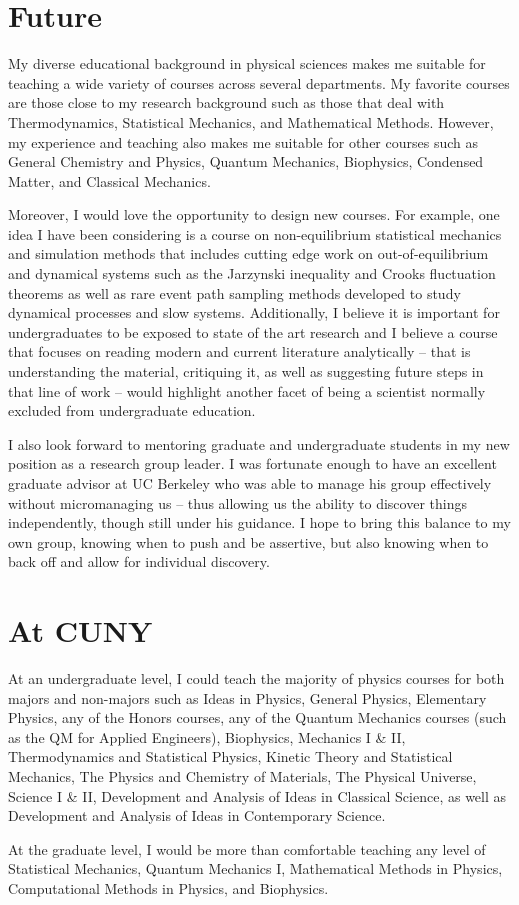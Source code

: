 \documentclass[11pt]{article}
\begin{document}
\section{Future} %

My diverse educational background in physical sciences makes me suitable for teaching a wide variety of courses across several departments.  My favorite courses are those close to my research background such as those that deal with Thermodynamics, Statistical Mechanics, and Mathematical Methods.  However, my experience and teaching also makes me suitable for other courses such as General Chemistry and Physics, Quantum Mechanics, Biophysics, Condensed Matter, and Classical Mechanics.

Moreover, I would love the opportunity to design new courses.  For example, one idea I have been considering is a course on non-equilibrium statistical mechanics and simulation methods that includes cutting edge work on out-of-equilibrium and dynamical systems such as the Jarzynski inequality and Crooks fluctuation theorems as well as rare event path sampling methods developed to study dynamical processes and slow systems.  Additionally, I believe it is important for undergraduates to be exposed to state of the art research and I believe a course that focuses on reading modern and current literature analytically -- that is understanding the material, critiquing it, as well as suggesting future steps in that line of work -- would highlight another facet of being a scientist normally excluded from undergraduate education.

I also look forward to mentoring graduate and undergraduate students in my new position as a research group leader.  I was fortunate enough to have an excellent graduate advisor at UC Berkeley who was able to manage his group effectively without micromanaging us -- thus allowing us the ability to discover things independently, though still under his guidance.  I hope to bring this balance to my own group, knowing when to push and be assertive, but also knowing when to back off and allow for individual discovery.

\section{At CUNY} %

At an undergraduate level, I could teach the majority of physics courses for both majors and non-majors such as Ideas in Physics, General Physics, Elementary Physics, any of the Honors courses, any of the Quantum Mechanics courses (such as the QM for Applied Engineers), Biophysics, Mechanics I \& II, Thermodynamics and Statistical Physics, Kinetic Theory and Statistical Mechanics, The Physics and Chemistry of Materials, The Physical Universe, Science I \& II, Development and Analysis of Ideas in Classical Science, as well as Development and Analysis of Ideas in Contemporary Science.

At the graduate level, I would be more than comfortable teaching any level of Statistical Mechanics, Quantum Mechanics I, Mathematical Methods in Physics, Computational Methods in Physics, and Biophysics.
\end{document}
